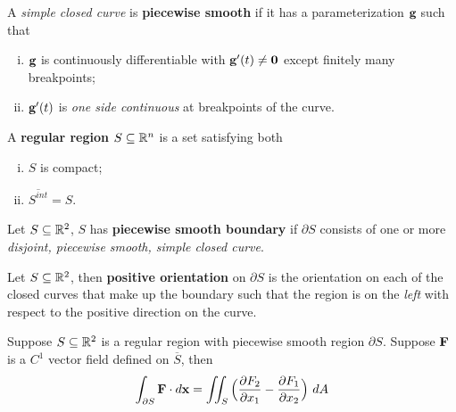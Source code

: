 \documentclass[11pt]{article}
\begin{document}
				\begin{definition}
					A \emph{simple closed curve} is \textbf{piecewise smooth} if it has a parameterization $\textbf{g}$ such that
					\begin{enumerate}[(i)]
						\item $\textbf{g}$ is continuously differentiable with $\textbf{g}'(t) \neq \textbf{0}$ except finitely many breakpoints;
						\item $\textbf{g}'(t)$ is \emph{one side continuous} at breakpoints of the curve.
					\end{enumerate}
				\end{definition}
				
				\begin{definition}
					A \textbf{regular region} $S \subseteq \mathbb{R}^n$ is a set satisfying both
					\begin{enumerate}[(i)]
						\item $S$ is compact;
						\item $\overline{S^{int}} = S$.
					\end{enumerate}
				\end{definition}
				
				\begin{definition}
					Let $S \subseteq \mathbb{R}^2$, $S$ has \textbf{piecewise smooth boundary} if $\partial S$ consists of one or more \emph{disjoint, piecewise smooth, simple closed curve}.
				\end{definition}
				
				\begin{definition}
					Let $S \subseteq \mathbb{R}^2$, then \textbf{positive orientation} on $\partial S$ is the orientation on each of the closed curves that make up the boundary such that the region is on the \emph{left} with respect to the positive direction on the curve.
				\end{definition}
				
				\begin{theorem}
					Suppose $S \subseteq \mathbb{R}^2$ is a regular region with piecewise smooth region $\partial S$. Suppose $\textbf{F}$ is a $C^1$ vector field defined on $\overline{S}$, then
					\begin{equation}
						\int_{\partial S} \textbf{F}\cdot d\textbf{x} = \iint_S \Big(\frac{\partial{F_2}}{\partial{x_1}} - \frac{\partial{F_1}}{\partial{x_2}}\Big)\ dA
					\end{equation}
				\end{theorem}
				
\end{document}
